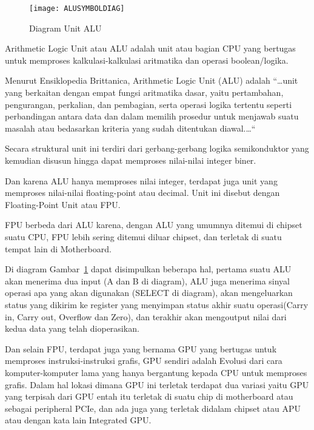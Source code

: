\begin{figure}[h]
    \centering
    \texttt{[image: ALUSYMBOLDIAG]}
    \caption{Diagram Unit ALU}
    \label{fig:ALUSYMBOLDIAG}
\end{figure}

Arithmetic Logic Unit atau ALU adalah unit atau bagian CPU yang bertugas untuk
memproses kalkulasi-kalkulasi aritmatika dan operasi boolean/logika.

Menurut Ensiklopedia Brittanica, Arithmetic Logic Unit (ALU) adalah ``\dots{}unit yang
berkaitan dengan empat fungsi aritmatika dasar, yaitu pertambahan, pengurangan,
perkalian, dan pembagian, serta operasi logika tertentu seperti perbandingan antara data
dan dalam memilih prosedur untuk menjawab suatu masalah atau bedasarkan kriteria yang
sudah ditentukan diawal.\dots{}``

Secara struktural unit ini terdiri dari gerbang-gerbang logika semikonduktor
yang kemudian disusun hingga dapat memproses nilai-nilai integer biner.

Dan karena ALU hanya memproses nilai integer, terdapat juga unit yang memproses nilai-nilai
floating-point atau decimal. Unit ini disebut dengan Floating-Point Unit atau FPU.

FPU berbeda dari ALU karena, dengan ALU yang umumnya ditemui di chipset suatu CPU,
FPU lebih sering ditemui diluar chipset, dan terletak di suatu tempat lain di Motherboard.

Di diagram Gambar~\ref{fig:ALUSYMBOLDIAG} dapat disimpulkan beberapa hal, pertama suatu ALU
akan menerima dua input (A dan B di diagram), ALU juga menerima sinyal operasi apa yang akan
digunakan (SELECT di diagram), akan mengeluarkan status yang dikirim ke register yang menyimpan
status akhir suatu operasi(Carry in, Carry out, Overflow dan Zero), dan terakhir akan mengoutput
nilai dari kedua data yang telah dioperasikan.

Dan selain FPU, terdapat juga yang bernama GPU yang bertugas untuk memproses instruksi-instruksi
grafis, GPU sendiri adalah Evolusi dari cara komputer-komputer lama yang hanya bergantung
kepada CPU untuk memproses grafis. Dalam hal lokasi dimana GPU ini terletak terdapat dua variasi
yaitu GPU yang terpisah dari GPU entah itu terletak di suatu chip di motherboard atau sebagai
peripheral PCIe, dan ada juga yang terletak didalam chipset atau APU atau dengan kata lain
Integrated GPU.
